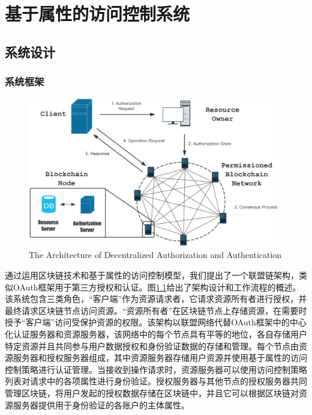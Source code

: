 
\chapter{基于属性的访问控制系统}

\section{系统设计}

\subsection{系统框架}

\begin{figure}
\centering
\includegraphics[width=11cm]{figures/archi.eps}
\caption{The Architecture of Decentralized Authorization and Authentication}
\label{fig:framework}
\end{figure}

通过运用区块链技术和基于属性的访问控制模型，我们提出了一个联盟链架构，类似OAuth框架用于第三方授权和认证。图\ref{fig:framework}给出了架构设计和工作流程的概述。该系统包含三类角色，“客户端”作为资源请求者，它请求资源所有者进行授权，并最终请求区块链节点访问资源。“资源所有者”在区块链节点上存储资源，在需要时授予“客户端”访问受保护资源的权限。该架构以联盟网络代替OAuth框架中的中心化认证服务器和资源服务器，该网络中的每个节点具有平等的地位，各自存储用户特定资源并且共同参与用户数据授权和身份验证数据的存储和管理。每个节点由资源服务器和授权服务器组成，其中资源服务器存储用户资源并使用基于属性的访问控制策略进行认证管理。当接收到操作请求时，资源服务器可以使用访问控制策略列表对请求中的各项属性进行身份验证。授权服务器与其他节点的授权服务器共同管理区块链，将用户发起的授权数据存储在区块链中，并且它可以根据区块链对资源服务器提供用于身份验证的各账户的主体属性。

